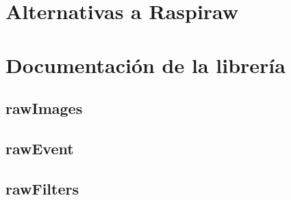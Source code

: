     \clearpage
    \appendix
    
    \section{Alternativas a Raspiraw}\label{sec:ap_alternatives}
    
    \section{Documentación de la librería}\label{sec:ap_doc}

    \subsection{rawImages}\label{sec:ap_doc:rawImages}

    \subsection{rawEvent}\label{sec:ap_doc:rawEvent}

    \subsection{rawFilters}\label{sec:ap_doc:rawFilters}


    
    